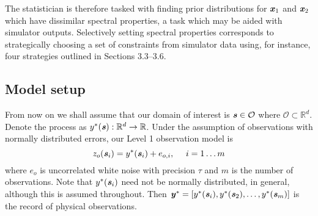 \documentclass[10pt,a4paper]{article}
\newcommand{\xvec} {\textbf{\textit{x}}}
\newcommand{\yvec} {\textbf{\textit{y}}}
\newcommand{\svec} {\textbf{\textit{s}}}
\begin{document}
The statistician is therefore tasked with finding prior distributions for $\xvec_1$ and $\xvec_2$ which have dissimilar spectral properties, a task which may be aided with simulator outputs. Selectively setting spectral properties corresponds to strategically choosing a set of constraints from simulator data using, for instance, four strategies outlined in Sections 3.3--3.6. 






\subsection{Model setup}

From now on we shall assume that our domain of interest is $\svec \in \mathcal{O}$ where $\mathcal{O} \subset \mathbb{R}^d$. Denote the process as  $y^*(\svec): \mathbb{R}^d \rightarrow \mathbb{R}$. Under the assumption of observations with normally distributed errors, our Level 1 observation model is 
\begin{equation}
z_o(\svec_i) = y^*(\svec_i) + e_{o,i}, ~~~~ i = 1\dots m
\end{equation}
\noindent where $e_o$ is uncorrelated white noise with precision $\tau$ and $m$ is the number of observations. Note that $y^*(\svec_i)$ need not be normally distributed, in general, although this is assumed throughout. Then $\yvec^* = [y^*(\svec_i), y^*(\svec_2), \dots, y^*(\svec_m)]$ is the record of physical observations. 
\end{document}

